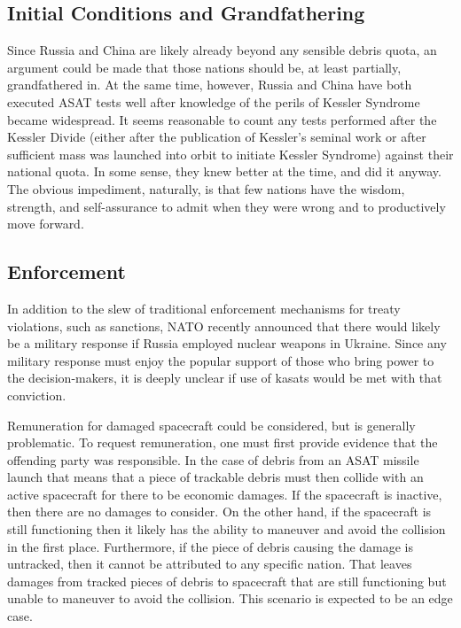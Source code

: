 \subsection{Initial Conditions and Grandfathering}
Since Russia and China are likely already beyond any sensible debris
quota, an argument could be made that those nations should be, at
least partially, grandfathered in.  At the same time, however, Russia
and China have both executed ASAT tests well after knowledge of the
perils of Kessler Syndrome became widespread.  It seems reasonable to
count any tests performed after the Kessler Divide (either after the
publication of Kessler's seminal work or after sufficient mass was
launched into orbit to initiate Kessler Syndrome) against their
national quota.  In some sense, they knew better at the time, and did
it anyway.  The obvious impediment, naturally, is that few nations
have the wisdom, strength, and self-assurance to admit when they were
wrong and to productively move forward.

\subsection{Enforcement}
In addition to the slew of traditional enforcement mechanisms for
treaty violations, such as sanctions, NATO recently announced that
there would likely be a military response if Russia employed nuclear
weapons in Ukraine.  Since any military response must enjoy the
popular support of those who bring power to the decision-makers, it is
deeply unclear if use of \acp{kasat} would be met with that
conviction.

Remuneration for damaged spacecraft could be considered, but is
generally problematic.  To request remuneration, one must first
provide evidence that the offending party was responsible.  In the
case of debris from an ASAT missile launch that means that a piece of
trackable debris must then collide with an active spacecraft for there
to be economic damages.  If the spacecraft is inactive, then there are
no damages to consider.  On the other hand, if the spacecraft is still
functioning then it likely has the ability to maneuver and avoid the
collision in the first place.  Furthermore, if the piece of debris
causing the damage is untracked, then it cannot be attributed to any
specific nation.  That leaves damages from tracked pieces of debris to
spacecraft that are still functioning but unable to maneuver to avoid
the collision.  This scenario is expected to be an edge case.


